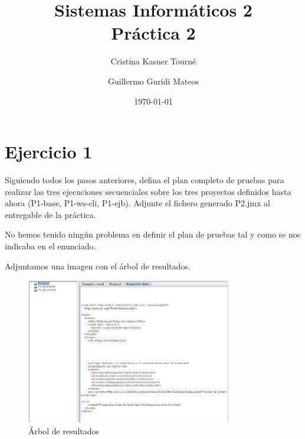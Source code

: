 \documentclass[a4paper, 10pt]{article}
\title{Sistemas Informáticos 2\\Práctica 2}
\author{Cristina Kasner Tourné\and Guillermo Guridi Mateos}
\date{\today}
\begin{document}

\section{Ejercicio 1}
\begin{mdframed} 
Siguiendo todos los pasos anteriores, defina el plan completo de pruebas para realizar las tres 
ejecuciones secuenciales sobre los tres proyectos definidos hasta ahora (P1-base, P1-ws-cli, P1-ejb). 
Adjunte el fichero generado P2.jmx al entregable de la práctica. 
\end{mdframed}
No hemos tenido ningún problema en definir el plan de pruebas tal y como se nos indicaba en el enunciado.

Adjuntamos una imagen con el árbol de resultados.

\begin{figure}[hbtp]
	 	\centering
	 	\includegraphics[width=0.8\textwidth]{../../p2/pantallazos/ejemplo_tree_result.png}
	 	\caption {Árbol de resultados}
	 \end{figure}

\pagebreak
\end{document}
